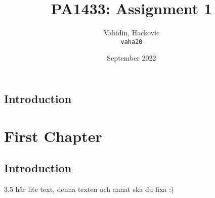 \documentclass{article}
\title{PA1433: Assignment 1}
\author{
  Vahidin, Hackovic\\
  \texttt{vaha20}
}
\date{September 2022}
\begin{document}
    \maketitle
    \section{Introduction}

    \chapter{First Chapter}
    \section{Introduction}
    3.5
    här lite text, denna texten och annat ska du fixa :)
\end{document}
